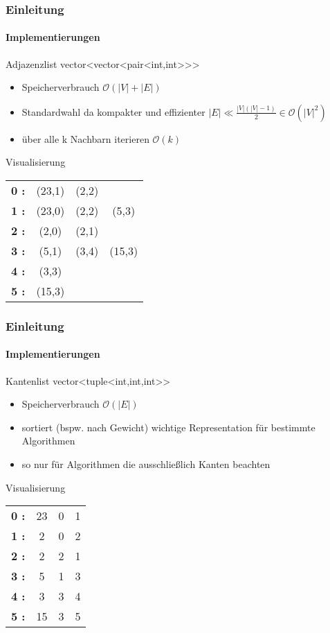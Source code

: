 \begin{frame}
    \frametitle{Einleitung}
    \framesubtitle{Implementierungen}
    \begin{KITexampleblock}{Adjazenzlist}
    vector<vector<pair<int,int>{}>{}>
    \begin{itemize}
        \item Speicherverbrauch \( \mathcal{O}(|V|+|E|)\)
        \item Standardwahl da kompakter und effizienter \( |E| \ll \frac{|V| (|V| - 1)}{2} \in \mathcal{O}(|V|^2)\)
        \item über alle k Nachbarn iterieren \( \mathcal{O}(k)\)
    \end{itemize}
    \end{KITexampleblock}
    \vspace{0.001em}
    \begin{KITinfoblock}{Visualisierung}
    \begin{tabular}{l c c c}
        \textbf{0 :  } & (23,1) & (2,2) \\
        \textbf{1 :  } & (23,0) & (2,2) & (5,3) \\
        \textbf{2 :  } & (2,0) & (2,1) \\
        \textbf{3 :  } & (5,1) & (3,4) & (15,3) \\
        \textbf{4 :  } & (3,3) \\
        \textbf{5 :  } & (15,3) \\
    \end{tabular}
    \end{KITinfoblock}
\end{frame}

\begin{frame}
    \frametitle{Einleitung}
    \framesubtitle{Implementierungen}
    \begin{KITexampleblock}{Kantenlist}
    vector<tuple<int,int,int>{}>
    \begin{itemize}
        \item Speicherverbrauch \( \mathcal{O}(|E|)\)
        \item sortiert (bspw. nach Gewicht) wichtige Representation für bestimmte Algorithmen
        \item so nur für Algorithmen die ausschließlich Kanten beachten
    \end{itemize}
    \end{KITexampleblock}
    \vspace{0.001em}
    \begin{KITinfoblock}{Visualisierung}
    \begin{tabular}{l c c c}
        \textbf{0 :  } & 23 & 0 & 1 \\
        \textbf{1 :  } & 2 & 0 & 2 \\
        \textbf{2 :  } & 2 & 2 & 1 \\
        \textbf{3 :  } & 5 & 1 & 3 \\
        \textbf{4 :  } & 3 & 3 & 4 \\
        \textbf{5 :  } & 15 & 3 & 5 \\
    \end{tabular}
    \end{KITinfoblock}
\end{frame}
